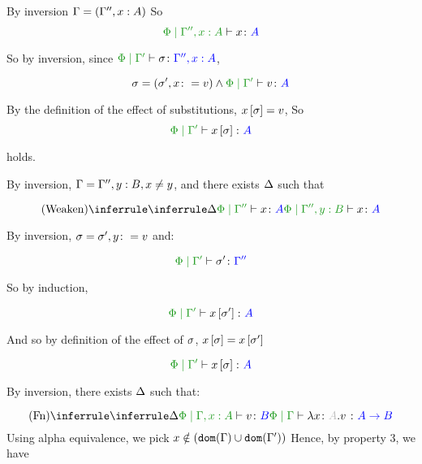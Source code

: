 {\proof
        By inversion $\Gamma = (\Gamma'', x:A)$
        So \begin{equation}
            \etyperelation{\P}{\G'',x:A}{x}{A}
        \end{equation}

        So by inversion, since $\etyperelation{\P}{\G'}{\si}{\G'', x:A}$, 

        \begin{equation}
            \si = (\si', x\setto v) \wedge \etyperelation{\P}{\G'}{v}{A}
        \end{equation}

        By the definition of the effect of substitutions, $x\left[\sigma\right] = v$, So
        \begin{equation}
            \etyperelation{\P}{\G'}{x\ssi}{A}
        \end{equation}

        holds.
        
        By inversion, $\Gamma = \Gamma'', y: B, x \neq y$, and there exists $\Delta$ such that

        \begin{equation}
            \ntreeruleI{Weaken}{\treeruleI{\D}{\etyperelation{\P}{\G''}{x}{A}}}{\etyperelation{\P}{\G'', y: B}{x}{A}}
        \end{equation}

        By inversion, $\sigma = \sigma', y\colon= v$
        and:

        \begin{equation}
            \etyperelation{\P}{\G'}{\si'}{\G''}
        \end{equation}

        So by induction,

        \begin{equation}
            \etyperelation{\P}{\G'}{x\sub{\si'}}{A}
        \end{equation}

        And so by definition of the effect of $\sigma$, $x\left[\sigma\right] = x\left[\sigma'\right]$

        \begin{equation}
            \etyperelation{\P}{\G'}{x\sub{\si}}{A}
        \end{equation}

    By inversion, there exists $\Delta$ such that:

    \begin{equation}
        \ntreeruleI{Fn}{
            \treeruleI{\D}{\etyperelation{\P}{\G, x:A }{v}{B}}
        }{\etyperelation{\P}{\G}{\lam{x}{A}{v}}{\ab}}
    \end{equation}
    Using alpha equivalence, we pick $x\notin(\texttt{dom}(\Gamma)\cup\texttt{dom}(\Gamma'))$
    Hence, by property 3, we have

}

